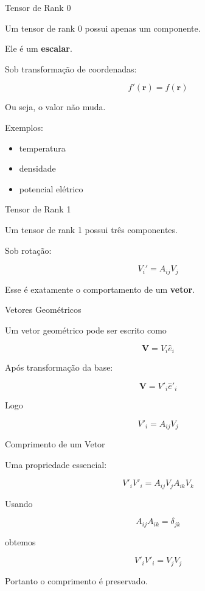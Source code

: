 \documentclass[aspectratio=169]{beamer}
\begin{document}
\begin{frame}{Tensor de Rank 0}

Um tensor de rank 0 possui apenas um componente.

Ele é um \textbf{escalar}.

Sob transformação de coordenadas:

\[
f'(\mathbf r)=f(\mathbf r)
\]

Ou seja, o valor não muda.

Exemplos:

\begin{itemize}
\item temperatura
\item densidade
\item potencial elétrico
\end{itemize}

\end{frame}

\begin{frame}{Tensor de Rank 1}

Um tensor de rank 1 possui três componentes.

Sob rotação:

\[
V_i' = A_{ij} V_j
\]

Esse é exatamente o comportamento de um \textbf{vetor}.

\end{frame}

\begin{frame}{Vetores Geométricos}

Um vetor geométrico pode ser escrito como

\[
\mathbf V = V_i \hat e_i
\]

Após transformação da base:

\[
\mathbf V = V'_i \hat e'_i
\]

Logo

\[
V'_i = A_{ij} V_j
\]

\end{frame}

\begin{frame}{Comprimento de um Vetor}

Uma propriedade essencial:

\[
V'_i V'_i = A_{ij}V_j A_{ik}V_k
\]

Usando

\[
A_{ij}A_{ik}=\delta_{jk}
\]

obtemos

\[
V'_i V'_i = V_j V_j
\]

Portanto o comprimento é preservado.

\end{frame}
\end{document}
